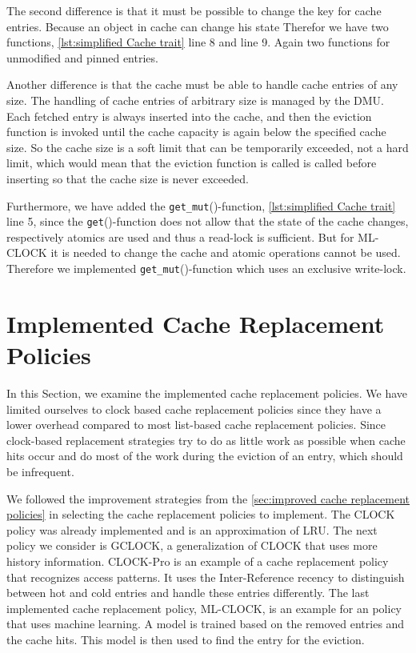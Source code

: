 \documentclass[
	12pt,
	a4paper,
	abstract,
	bibliography=totoc,
	chapterprefix,
	headings=openright,
	numbers=endperiod,
	parskip=half,
	twoside,
]{scrreprt}
\begin{document}
The second difference is that it must be possible to change the key for cache entries.
Because an object in cache can change his state 
Therefor we have two functions, \cref{lst:simplified Cache trait} line 8 and line 9. 
Again two functions for unmodified and pinned entries.

Another difference is that the cache must be able to handle cache entries of any size.
The handling of cache entries of arbitrary size is managed by the DMU.
Each fetched entry is always inserted into the cache, and then the eviction function is invoked until the cache capacity is again below the specified cache size.
So the cache size is a soft limit that can be temporarily exceeded, not a hard limit, which would mean that the eviction function is called
is called before inserting so that the cache size is never exceeded.

Furthermore, we have added the \texttt{get\_mut}()-function, \cref{lst:simplified Cache trait} line 5, 
since the \texttt{get}()-function does not allow that the state of the cache changes, respectively atomics are used and thus a read-lock is sufficient.
But for ML-CLOCK it is needed to change the cache and atomic operations cannot be used.
Therefore we implemented \texttt{get\_mut}()-function which uses an exclusive write-lock.

\section{Implemented Cache Replacement Policies}
\label{sec:implemented cache replacement policies}

In this Section, we examine the implemented cache replacement policies.
We have limited ourselves to clock based cache replacement policies since they have a lower overhead compared
to most list-based cache replacement policies.
Since clock-based replacement strategies try to do as little work as possible when cache hits occur and 
do most of the work during the eviction of an entry, which should be infrequent.

We followed the improvement strategies from the \cref{sec:improved cache replacement policies}
in selecting the cache replacement policies to implement.
The CLOCK policy was already implemented and is an approximation of LRU.
The next policy we consider is GCLOCK, a generalization of CLOCK that uses more history information.
CLOCK-Pro is an example of a cache replacement policy that recognizes access patterns.
It uses the Inter-Reference recency to distinguish between hot and cold entries and handle these entries differently.
The last implemented cache replacement policy, ML-CLOCK, is an example for an policy that uses machine learning.
A model is trained based on the removed entries and the cache hits. 
This model is then used to find the entry for the eviction.
\end{document}
